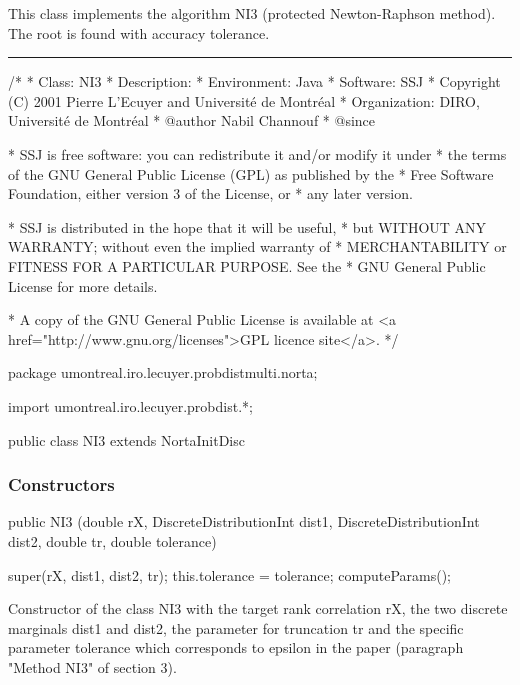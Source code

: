 This class implements the algorithm NI3 (protected Newton-Raphson method).
  The root is found with accuracy tolerance.

\bigskip\hrule

\begin{code}
\begin{hide}
/*
 * Class:        NI3
 * Description:
 * Environment:  Java
 * Software:     SSJ
 * Copyright (C) 2001  Pierre L'Ecuyer and Université de Montréal
 * Organization: DIRO, Université de Montréal
 * @author       Nabil Channouf
 * @since

 * SSJ is free software: you can redistribute it and/or modify it under
 * the terms of the GNU General Public License (GPL) as published by the
 * Free Software Foundation, either version 3 of the License, or
 * any later version.

 * SSJ is distributed in the hope that it will be useful,
 * but WITHOUT ANY WARRANTY; without even the implied warranty of
 * MERCHANTABILITY or FITNESS FOR A PARTICULAR PURPOSE.  See the
 * GNU General Public License for more details.

 * A copy of the GNU General Public License is available at
   <a href="http://www.gnu.org/licenses">GPL licence site</a>.
 */
\end{hide}
package umontreal.iro.lecuyer.probdistmulti.norta;
\begin{hide}
import umontreal.iro.lecuyer.probdist.*;
\end{hide}

public class NI3 extends NortaInitDisc \begin{hide}
{
   private double tolerance; /* Desired accuracy for the root-finder
   			        algorithm (epsilon in paragraph
   			        "Method NI3" of section 3 in paper).*/
\end{hide}
\end{code}
\subsubsection* {Constructors}

\begin{code}

   public NI3 (double rX, DiscreteDistributionInt dist1,
               DiscreteDistributionInt dist2, double tr, double tolerance)\begin{hide}
   {
      super(rX, dist1, dist2, tr);
      this.tolerance = tolerance;
      computeParams();
   }\end{hide}
\end{code}
\begin{tabb}
   Constructor of the class NI3 with the target rank correlation rX,
       the two discrete marginals dist1 and dist2,
     the parameter for truncation tr and the specific parameter
      tolerance which corresponds to epsilon in the paper
      (paragraph "Method NI3" of section 3).
\end{tabb}

